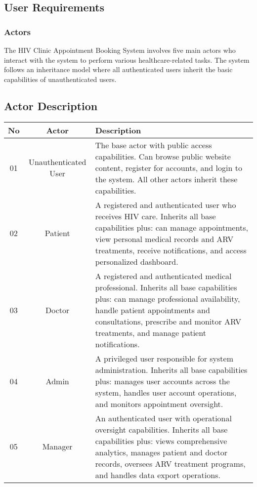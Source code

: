\documentclass[12pt,a4paper]{article}
\begin{document}
\subsection{User Requirements}

\subsubsection{Actors}

The HIV Clinic Appointment Booking System involves five main actors who interact with the system to perform various healthcare-related tasks. The system follows an inheritance model where all authenticated users inherit the basic capabilities of unauthenticated users.

\subsection{Actor Description}

\begin{longtable}{|c||c|p{9cm}|}
\hline
\textbf{No} & \textbf{Actor} & \textbf{Description} \\
\hline
01 & Unauthenticated User & The base actor with public access capabilities. Can browse public website content, register for accounts, and login to the system. All other actors inherit these capabilities. \\
\hline
02 & Patient & A registered and authenticated user who receives HIV care. Inherits all base capabilities plus: can manage appointments, view personal medical records and ARV treatments, receive notifications, and access personalized dashboard. \\
\hline
03 & Doctor & A registered and authenticated medical professional. Inherits all base capabilities plus: can manage professional availability, handle patient appointments and consultations, prescribe and monitor ARV treatments, and manage patient notifications. \\
\hline
04 & Admin & A privileged user responsible for system administration. Inherits all base capabilities plus: manages user accounts across the system, handles user account operations, and monitors appointment oversight. \\
\hline
05 & Manager & An authenticated user with operational oversight capabilities. Inherits all base capabilities plus: views comprehensive analytics, manages patient and doctor records, oversees ARV treatment programs, and handles data export operations. \\
\hline
\end{longtable}
\end{document}
